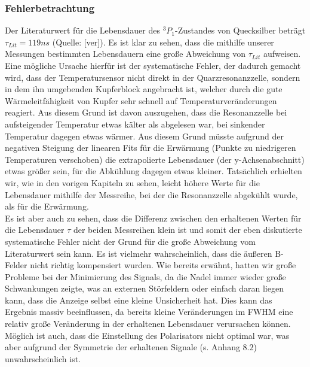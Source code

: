 \subsubsection{Fehlerbetrachtung}
Der Literaturwert für die Lebensdauer des $^{3}P_{1}$-Zustandes von Quecksilber beträgt $\tau_{Lit}=119 ns$ (Quelle: [ver]). Es ist klar zu sehen, dass die mithilfe unserer Messungen bestimmten Lebensdauern eine große Abweichung von $\tau_{Lit}$ aufweisen. \\
Eine mögliche Ursache hierfür ist der systematische Fehler, der dadurch gemacht wird, dass der Temperatursensor nicht direkt in der Quarzresonanzzelle, sondern in dem ihn umgebenden Kupferblock angebracht ist, welcher durch die gute Wärmeleitfähigkeit von Kupfer sehr schnell auf Temperaturveränderungen reagiert. Aus diesem Grund ist davon auszugehen, dass die Resonanzzelle bei aufsteigender Temperatur etwas kälter als abgelesen war, bei sinkender Temperatur dagegen etwas wärmer. Aus diesem Grund müsste aufgrund der negativen Steigung der linearen Fits für die Erwärmung (Punkte zu niedrigeren Temperaturen verschoben) die extrapolierte Lebensdauer (der y-Achsenabschnitt) etwas größer sein, für die Abkühlung dagegen etwas kleiner. Tatsächlich erhielten wir, wie in den vorigen Kapiteln zu sehen, leicht höhere Werte für die Lebensdauer mithilfe der Messreihe, bei der die Resonanzzelle abgekühlt wurde, als für die Erwärmung. \\
Es ist aber auch zu sehen, dass die Differenz zwischen den erhaltenen Werten für die Lebensdauer $\tau$ der beiden Messreihen klein ist und somit der eben diskutierte systematische Fehler nicht der Grund für die große Abweichung vom Literaturwert sein kann. Es ist vielmehr wahrscheinlich, dass die äußeren B-Felder nicht richtig kompensiert wurden. Wie bereits erwähnt, hatten wir große Probleme bei der Minimierung des Signals, da die Nadel immer wieder große Schwankungen zeigte, was an externen Störfeldern oder einfach daran liegen kann, dass die Anzeige selbst eine kleine Unsicherheit hat. Dies kann das Ergebnis massiv beeinflussen, da bereits kleine Veränderungen im FWHM eine relativ große Veränderung in der erhaltenen Lebensdauer verursachen können.\\
Möglich ist auch, dass die Einstellung des Polarisators nicht optimal war, was aber aufgrund der Symmetrie der erhaltenen Signale (s. Anhang $8.2$) unwahrscheinlich ist.
